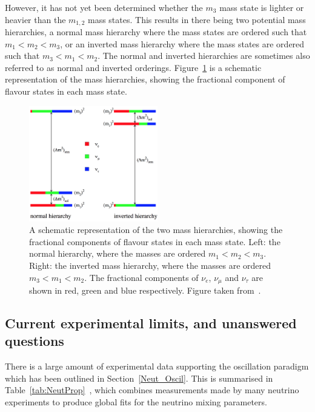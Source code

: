 However, it has not yet been determined whether the $m_{3}$ mass state is lighter or heavier than the $m_{1,2}$ mass states. This results in there being two potential mass hierarchies, a normal mass hierarchy where the mass states are ordered such that $m_{{1}} < m_{{2}} < m_{{3}}$, or an inverted mass hierarchy where the mass states are ordered such that $m_{{3}} < m_{{1}} < m_{{2}}$. The normal and inverted hierarchies are sometimes also referred to as normal and inverted orderings. Figure~\ref{fig:Neut_MH} is a schematic representation of the mass hierarchies, showing the fractional component of flavour states in each mass state. \\
\begin{figure}
  \centering
  \includegraphics[width=0.5\textwidth]{MassHierarchy}
  \caption[A schematic representation of the two mass hierarchies, showing the fractional components of flavour states in each mass state]
          {A schematic representation of the two mass hierarchies, showing the fractional components of flavour states in each mass state. Left: the normal hierarchy, where the masses are ordered $m_{{1}} < m_{{2}} < m_{{3}}$. Right: the inverted mass hierarchy, where the masses are ordered $m_{{3}} < m_{{1}} < m_{{2}}$. The fractional components of $\nu_{e}$, $\nu_{\mu}$ and $\nu_{\tau}$ are shown in red, green and blue respectively. Figure taken from~\citep{Hewett:2012ns}.}
  \label{fig:Neut_MH}
\end{figure}

\subsection{Current experimental limits, and unanswered questions} \label{sec:Theory_Exp}
There is a large amount of experimental data supporting the oscillation paradigm which has been outlined in Section~\ref{Neut_Oscil}. This is summarised in Table~\ref{tab:NeutProp}~\citep{NuFit2016}, which combines measurements made by many neutrino experiments to produce global fits for the neutrino mixing parameters. \\ 

